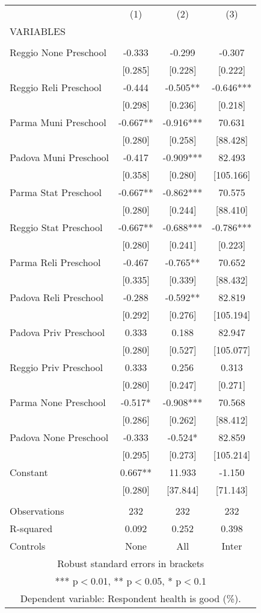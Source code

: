 \begin{tabular}{lccc} \hline
 & (1) & (2) & (3) \\
VARIABLES &  &  &  \\ \hline
 &  &  &  \\
Reggio None Preschool & -0.333 & -0.299 & -0.307 \\
 & [0.285] & [0.228] & [0.222] \\
Reggio Reli Preschool & -0.444 & -0.505** & -0.646*** \\
 & [0.298] & [0.236] & [0.218] \\
Parma Muni Preschool & -0.667** & -0.916*** & 70.631 \\
 & [0.280] & [0.258] & [88.428] \\
Padova Muni Preschool & -0.417 & -0.909*** & 82.493 \\
 & [0.358] & [0.280] & [105.166] \\
Parma Stat Preschool & -0.667** & -0.862*** & 70.575 \\
 & [0.280] & [0.244] & [88.410] \\
Reggio Stat Preschool & -0.667** & -0.688*** & -0.786*** \\
 & [0.280] & [0.241] & [0.223] \\
Parma Reli Preschool & -0.467 & -0.765** & 70.652 \\
 & [0.335] & [0.339] & [88.432] \\
Padova Reli Preschool & -0.288 & -0.592** & 82.819 \\
 & [0.292] & [0.276] & [105.194] \\
Padova Priv Preschool & 0.333 & 0.188 & 82.947 \\
 & [0.280] & [0.527] & [105.077] \\
Reggio Priv Preschool & 0.333 & 0.256 & 0.313 \\
 & [0.280] & [0.247] & [0.271] \\
Parma None Preschool & -0.517* & -0.908*** & 70.568 \\
 & [0.286] & [0.262] & [88.412] \\
Padova None Preschool & -0.333 & -0.524* & 82.859 \\
 & [0.295] & [0.273] & [105.214] \\
Constant & 0.667** & 11.933 & -1.150 \\
 & [0.280] & [37.844] & [71.143] \\
 &  &  &  \\
Observations & 232 & 232 & 232 \\
R-squared & 0.092 & 0.252 & 0.398 \\
 Controls & None & All & Inter \\ \hline
\multicolumn{4}{c}{ Robust standard errors in brackets} \\
\multicolumn{4}{c}{ *** p$<$0.01, ** p$<$0.05, * p$<$0.1} \\
\multicolumn{4}{c}{ Dependent variable: Respondent health is good (\%).} \\
\end{tabular}
